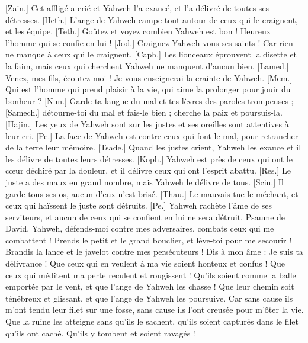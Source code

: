 \begin{multicols}{2}
[Zain.] Cet affligé a crié et Yahweh l'a exaucé, et l'a délivré de toutes ses détresses.
[Heth.] L'ange de Yahweh campe tout autour de ceux qui le craignent, et les équipe.
[Teth.] Goûtez et voyez combien Yahweh est bon ! Heureux l'homme qui se confie en lui !
[Jod.] Craignez Yahweh vous ses saints ! Car rien ne manque à ceux qui le craignent.
[Caph.] Les lionceaux éprouvent la disette et la faim, mais ceux qui cherchent Yahweh ne manquent d'aucun bien.
[Lamed.] Venez, mes fils, écoutez-moi ! Je vous enseignerai la crainte de Yahweh.
[Mem.] Qui est l'homme qui prend plaisir à la vie, qui aime la prolonger pour jouir du bonheur ?
[Nun.] Garde ta langue du mal et tes lèvres des paroles trompeuses ;
[Samech.] détourne-toi du mal et fais-le bien ; cherche la paix et poursuis-la.
[Hajin.] Les yeux de Yahweh sont sur les justes et ses oreilles sont attentives à leur cri.
[Pe.] La face de Yahweh est contre ceux qui font le mal, pour retrancher de la terre leur mémoire.
[Tsade.] Quand les justes crient, Yahweh les exauce et il les délivre de toutes leurs détresses.
[Koph.] Yahweh est près de ceux qui ont le cœur déchiré par la douleur, et il délivre ceux qui ont l'esprit abattu.
[Res.] Le juste a des maux en grand nombre, mais Yahweh le délivre de tous.
[Scin.] Il garde tous ses os, aucun d’eux n'est brisé.
[Thau.] Le mauvais tue le méchant, et ceux qui haïssent le juste sont détruits.
[Pe.] Yahweh rachète l'âme de ses serviteurs, et aucun de ceux qui se confient en lui ne sera détruit.
\TextTitle{Prière pour que Dieu fasse justice]}
\VerseOne{}Psaume de David. Yahweh, défends-moi contre mes adversaires, combats ceux qui me combattent !
Prends le petit et le grand bouclier, et lève-toi pour me secourir !
Brandis la lance et le javelot contre mes persécuteurs ! Dis à mon âme : Je suis ta délivrance !
Que ceux qui en veulent à ma vie soient honteux et confus ! Que ceux qui méditent ma perte reculent et rougissent !
Qu'ils soient comme la balle emportée par le vent, et que l'ange de Yahweh les chasse !
Que leur chemin soit ténébreux et glissant, et que l'ange de Yahweh les poursuive.
Car sans cause ils m'ont tendu leur filet sur une fosse, sans cause ils l’ont creusée pour m’ôter la vie.
Que la ruine les atteigne sans qu’ils le sachent, qu’ils soient capturés dans le filet qu’ils ont caché. Qu’ils y tombent et soient ravagés !

\end{multicols}
